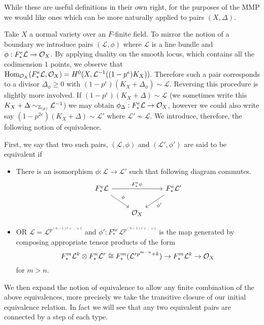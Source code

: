 While these are useful definitions in their own right, for the purposes of the MMP we would like ones which can be more naturally applied to pairs $(X,\Delta)$.

Take $X$ a normal variety over an $F$-finite field. To mirror the notion of a boundary we introduce pairs $(\mathcal{L}, \phi)$ where $\mathcal{L}$ is a line bundle and $\phi: F^{e}_{*} \mathcal{L} \to \mathcal{O}_{X}$. By applying duality on the smooth locus, which contains all the codimension $1$ points, we observe that $\textup{Hom}_{\mathcal{O}_{X}}(F^{e}_{*} \mathcal{L},\mathcal{O}_{X})=H^{0}(X,\mathcal{L}^{-1}((1-p^{e})K_{X}))$. Therefore such a pair corresponds to a divisor $\Delta_{\phi} \geq 0$ with $(1-p^{e})(K_{X}+\Delta_{\phi}) \sim \mathcal{L}$. Reversing this procedure is slightly more involved. If ${(1-p^{e})(K_{X}+\Delta) \sim \mathcal{L}}$ (we sometimes write this $K_{X}+\Delta \sim_{\mathbb{Z}_{(p)}} \mathcal{L}^{-1}$) we may obtain $\phi_{\Delta}:F^{e}_{*} \mathcal{L} \to \mathcal{O}_{X}$, however we could also write say $(1-p^{2e})(K_{X}+\Delta) \sim \mathcal{L'}$ where $\mathcal{L'} \not\sim \mathcal{L}$. We introduce, therefore, the following notion of equivalence.

First, we say that two such pairs, $(\mathcal{L}, \phi)$ and $(\mathcal{L}', \phi')$ are said to be equivalent if

\begin{itemize}
	\item There is an isomorphism $\phi: \mathcal{L} \to \mathcal{L'}$ such that following diagram commutes.
	\[\begin{tikzcd}
	\Fe \mathcal{L} \arrow[rd, "\phi"] \arrow[rr, "\Fe \psi"] &     & \Fe \mathcal{L}' \arrow[ld, "\phi'"] \\
	& \ox &                                     
	\end{tikzcd}\]
	\item OR $\mathcal{L}=\mathcal{L}^{p^{(n-1)e+...+1}}$ and $\phi':F_{*}^{ne}\mathcal{L}^{p^{(n-1)e+...+1}}$ is the map generated by composing appropriate tensor products of the form $$F_{*}^{m}\mathcal{L}^{k} \otimes F_{*}^{n} \mathcal{L}^{r}\cong F_{*}^{m}(\mathcal{L}^{rp^{m-n}+k}) \to F^{m}_{*}\mathcal{L}^{k}\to \mathcal{O}_{X}$$ for $m>n$.
\end{itemize}

We then expand the notion of equivalence to allow any finite combination of the above equivalences, more precisely we take the transitive closure of our initial equivalence relation. In fact we will see that any two equivalent pairs are connected by a step of each type.

